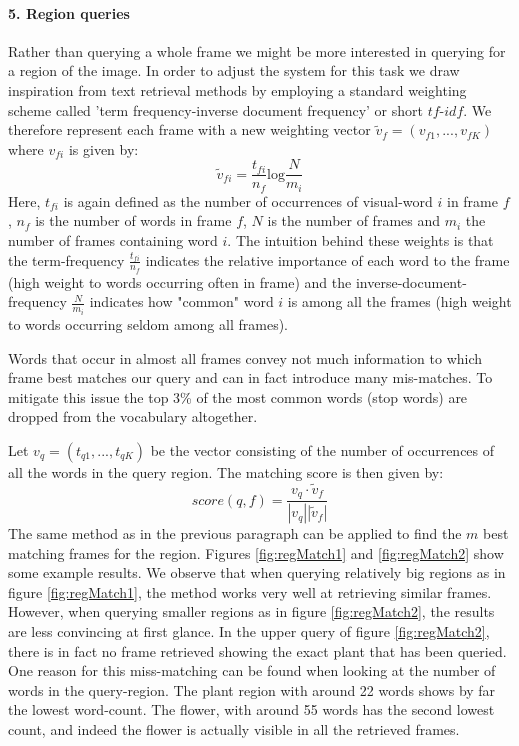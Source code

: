 \documentclass{paper}
\begin{document}
\paragraph{5. Region queries}
Rather than querying a whole frame we might be more interested in querying for a region of the image. In order to adjust the system for this task we draw inspiration from text retrieval methods by employing a standard weighting scheme called 'term frequency-inverse document frequency' or short $tf$-$idf$. We therefore represent each frame with a new weighting vector $\tilde{v}_f=(v_{f1},...,v_{fK})$ where $v_{fi}$ is given by:
\begin{equation}
\tilde{v}_{fi}= \frac{t_{fi}}{n_f}\text{log} \frac{N}{m_i}
\end{equation}
Here, $t_{fi}$ is again defined as the number of occurrences of visual-word $i$ in frame $f$, $n_f$ is the number of words in frame $f$, $N$ is the number of frames and $m_i$ the number of frames containing word $i$. The intuition behind these weights is that the term-frequency $\frac{t_{fi}}{n_f}$ indicates the relative importance of each word to the frame (high weight to words occurring often in frame) and the inverse-document-frequency $\frac{N}{m_i}$ indicates how "common" word $i$ is among all the frames (high weight to words occurring seldom among all frames).

Words that occur in almost all frames convey not much information to which frame best matches our query and can in fact introduce many mis-matches. To mitigate this issue the top 3\% of the most common words (stop words) are dropped from the vocabulary altogether. 

Let $v_q=(t_{q1},...,t_{qK})$ be the vector consisting of the number of occurrences of all the words in the query region. The matching score is then given by:
\begin{equation}
score(q,f)= \frac{v_q\cdot \tilde{v}_f}{|v_q| | \tilde{v}_f|}
\end{equation}
The same method as in the previous paragraph can be applied to find the $m$ best matching frames for the region. Figures \ref{fig:regMatch1} and \ref{fig:regMatch2} show some example results. We observe that when querying relatively big regions as in figure \ref{fig:regMatch1}, the method works very well at retrieving similar frames. However, when querying smaller regions as in figure \ref{fig:regMatch2}, the results are less convincing at first glance. In the upper query of figure \ref{fig:regMatch2}, there is in fact no frame retrieved showing the exact plant that has been queried. One reason for this miss-matching can be found when looking at the number of words in the query-region. The plant region with around 22 words shows by far the lowest word-count. The flower, with around 55 words has the second lowest count, and indeed the flower is actually visible in all the retrieved frames. 
\end{document}
